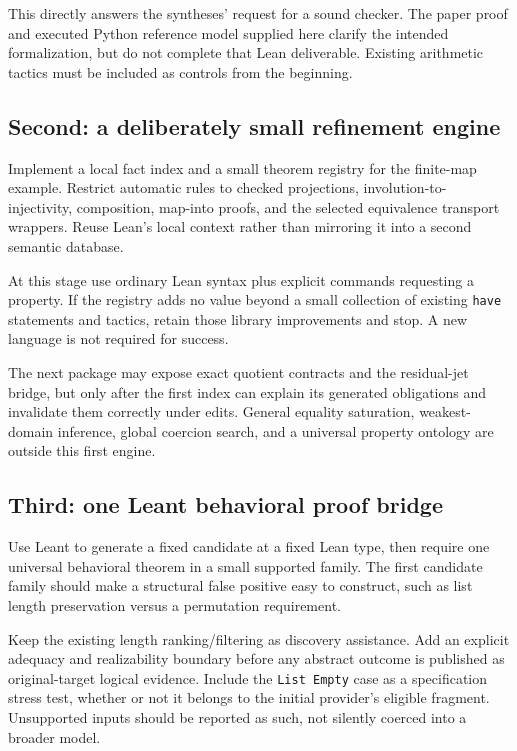 \documentclass[11pt,letterpaper]{article}
\newcommand{\code}[1]{\nolinkurl{#1}}
\theoremstyle{remark}
\begin{document}
This directly answers the syntheses' request for a sound checker. The paper
proof and executed Python reference model supplied here clarify the intended
formalization, but do not complete that Lean deliverable. Existing arithmetic
tactics must be included as controls from the beginning.

\subsection{Second: a deliberately small refinement engine}
Implement a local fact index and a small theorem registry for the finite-map
example. Restrict automatic rules to checked projections, involution-to-
injectivity, composition, map-into proofs, and the selected equivalence
transport wrappers. Reuse Lean's local context rather than mirroring it into a
second semantic database.

At this stage use ordinary Lean syntax plus explicit commands requesting a
property. If the registry adds no value beyond a small collection of existing
\code{have} statements and tactics, retain those library improvements and stop.
A new language is not required for success.

The next package may expose exact quotient contracts and the residual-jet
bridge, but only after the first index can explain its generated obligations
and invalidate them correctly under edits. General equality saturation,
weakest-domain inference, global coercion search, and a universal property
ontology are outside this first engine.

\subsection{Third: one Leant behavioral proof bridge}
Use Leant to generate a fixed candidate at a fixed Lean type, then require one
universal behavioral theorem in a small supported family. The first candidate
family should make a structural false positive easy to construct, such as
list length preservation versus a permutation requirement.

Keep the existing length ranking/filtering as discovery assistance. Add an
explicit adequacy and realizability boundary before any abstract outcome is
published as original-target logical evidence. Include the \code{List Empty}
case as a specification stress test, whether or not it belongs to the initial
provider's eligible fragment. Unsupported inputs should be reported as such,
not silently coerced into a broader model.
\end{document}
